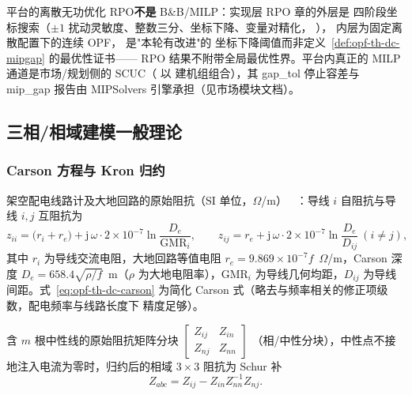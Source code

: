 \begin{gapnote}
平台的离散无功优化 RPO\textbf{不是} B\&B/MILP：实现层 RPO 章的外层是
四阶段坐标搜索（$\pm1$ 扰动灵敏度、整数三分、坐标下降、变量对精化，
），
内层为固定离散配置下的连续 OPF， 是"本轮有改进"的
坐标下降阈值而非定义~\ref{def:opf-th-dc-mipgap} 的最优性证书——
RPO 结果不附带全局最优性界。平台内真正的 MILP 通道是市场/规划侧的
SCUC（ 以
 建机组组合），其 gap\_tol 停止容差与 mip\_gap
报告由 MIPSolvers 引擎承担（见市场模块文档）。
\end{gapnote}

\subsection{三相/相域建模一般理论}\label{sec:opf-th-dc-phase}

\subsubsection{Carson 方程与 Kron 归约}

\begin{definition}[Carson 方程]\label{def:opf-th-dc-carson}
架空配电线路计及大地回路的原始阻抗（SI 单位，$\Omega$/m）
~\cite{opfdc:carson,opfdc:kersting}：导线 $i$ 自阻抗与导线 $i,j$
互阻抗为
\begin{equation}
z_{ii}=\bigl(r_i+r_e\bigr)+\mathrm j\,\omega\cdot2\times10^{-7}
\ln\frac{D_e}{\mathrm{GMR}_i},\qquad
z_{ij}=r_e+\mathrm j\,\omega\cdot2\times10^{-7}\ln\frac{D_e}{D_{ij}}
\ (i\neq j),
\label{eq:opf-th-dc-carson}
\end{equation}
其中 $r_i$ 为导线交流电阻，大地回路等值电阻
$r_e=9.869\times10^{-7}f$~$\Omega$/m，Carson 深度
$D_e=658.4\sqrt{\rho/f}$~m（$\rho$ 为大地电阻率），$\mathrm{GMR}_i$
为导线几何均距，$D_{ij}$ 为导线间距。式~\eqref{eq:opf-th-dc-carson}
为简化 Carson 式（略去与频率相关的修正项级数，配电频率与线路长度下
精度足够）。
\end{definition}

\begin{proposition}\label{prop:opf-th-dc-kron}
含 $m$ 根中性线的原始阻抗矩阵分块
$\begin{bmatrix}Z_{ij}&Z_{in}\\ Z_{nj}&Z_{nn}\end{bmatrix}$
（相/中性分块），中性点不接地注入电流为零时，归约后的相域
$3\times3$ 阻抗为 Schur 补
\begin{equation}
Z_{abc}=Z_{ij}-Z_{in}Z_{nn}^{-1}Z_{nj}.
\label{eq:opf-th-dc-kron}
\end{equation}
\end{proposition}

